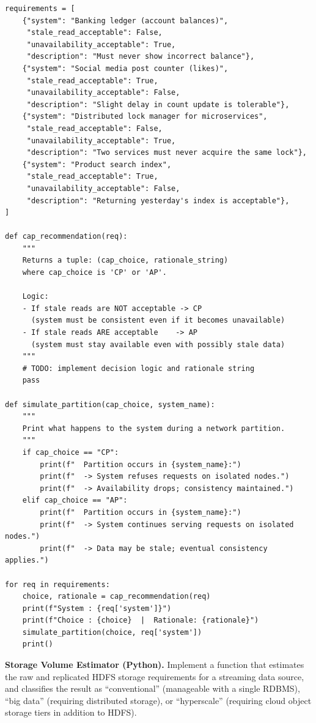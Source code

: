 \begin{lstlisting}[style=pyspark, caption={PE1.2: CAP trade-off recommender}]
requirements = [
    {"system": "Banking ledger (account balances)",
     "stale_read_acceptable": False,
     "unavailability_acceptable": True,
     "description": "Must never show incorrect balance"},
    {"system": "Social media post counter (likes)",
     "stale_read_acceptable": True,
     "unavailability_acceptable": False,
     "description": "Slight delay in count update is tolerable"},
    {"system": "Distributed lock manager for microservices",
     "stale_read_acceptable": False,
     "unavailability_acceptable": True,
     "description": "Two services must never acquire the same lock"},
    {"system": "Product search index",
     "stale_read_acceptable": True,
     "unavailability_acceptable": False,
     "description": "Returning yesterday's index is acceptable"},
]

def cap_recommendation(req):
    """
    Returns a tuple: (cap_choice, rationale_string)
    where cap_choice is 'CP' or 'AP'.

    Logic:
    - If stale reads are NOT acceptable -> CP
      (system must be consistent even if it becomes unavailable)
    - If stale reads ARE acceptable    -> AP
      (system must stay available even with possibly stale data)
    """
    # TODO: implement decision logic and rationale string
    pass

def simulate_partition(cap_choice, system_name):
    """
    Print what happens to the system during a network partition.
    """
    if cap_choice == "CP":
        print(f"  Partition occurs in {system_name}:")
        print(f"  -> System refuses requests on isolated nodes.")
        print(f"  -> Availability drops; consistency maintained.")
    elif cap_choice == "AP":
        print(f"  Partition occurs in {system_name}:")
        print(f"  -> System continues serving requests on isolated nodes.")
        print(f"  -> Data may be stale; eventual consistency applies.")

for req in requirements:
    choice, rationale = cap_recommendation(req)
    print(f"System : {req['system']}")
    print(f"Choice : {choice}  |  Rationale: {rationale}")
    simulate_partition(choice, req['system'])
    print()
\end{lstlisting}

\pe \textbf{Storage Volume Estimator (Python).}
Implement a function that estimates the raw and replicated HDFS storage
requirements for a streaming data source, and classifies the result as
``conventional'' (manageable with a single RDBMS), ``big data''
(requiring distributed storage), or ``hyperscale'' (requiring cloud
object storage tiers in addition to HDFS).

